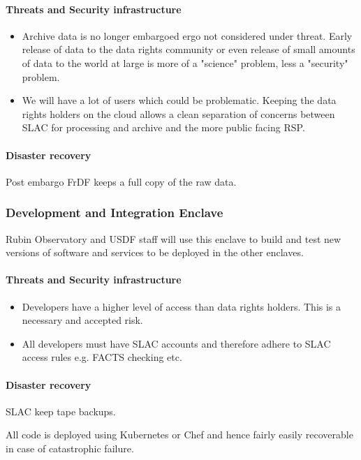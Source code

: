 \paragraph{ Threats and Security infrastructure}

\begin{itemize}
\item Archive data is no longer embargoed ergo not considered under threat.  Early release of data to the data rights community or even release of small amounts of data to the world at large is more of a "science" problem, less a "security" problem.
\item We will have a lot of users which could be problematic. Keeping the data rights holders on the cloud allows a clean separation of concerns between SLAC for processing and archive and the more public facing \gls{RSP}.
\end{itemize}
\paragraph{Disaster recovery}
Post embargo FrDF keeps a full copy of the raw data.


\subsubsection{Development and Integration  \gls{Enclave}}
Rubin Observatory and \gls{USDF} staff will use this enclave to build and test new versions of software and services to be deployed in the other enclaves.

\paragraph{Threats and Security infrastructure}

\begin{itemize}
\item Developers have a higher level of access than data rights holders.
This is a necessary and accepted risk.
\item All developers must have SLAC accounts and therefore adhere to SLAC access rules e.g. FACTS checking etc.
\end{itemize}

\paragraph{Disaster recovery}
SLAC keep tape backups.

All code is deployed using Kubernetes or Chef and hence fairly easily recoverable in case of catastrophic failure.


